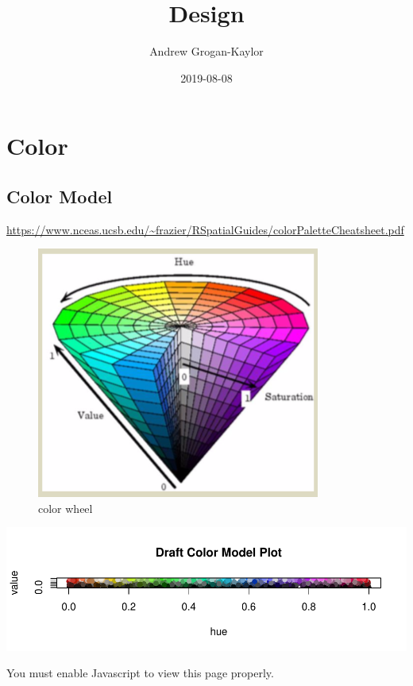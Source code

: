 \documentclass[]{article}
\title{Design}
\author{Andrew Grogan-Kaylor}
\date{2019-08-08}
\begin{document}
\maketitle

{
\setcounter{tocdepth}{2}
\tableofcontents
}
\hypertarget{color}{%
\section{Color}\label{color}}

\hypertarget{color-model}{%
\subsection{Color Model}\label{color-model}}

\url{https://www.nceas.ucsb.edu/~frazier/RSpatialGuides/colorPaletteCheatsheet.pdf}

\begin{figure}
\centering
\includegraphics{colorwheel.png}
\caption{color wheel}
\end{figure}

\includegraphics{design_files/figure-latex/unnamed-chunk-1-1.pdf}

\hypertarget{unnamed_chunk_1div}{}

You must enable Javascript to view this page properly.
\end{document}
